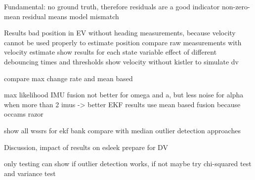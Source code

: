 Fundamental: no ground truth, therefore residuals are a good indicator
non-zero-mean residual means model mismatch~\cite[p.~158]{AlexanderWischnewski.2019}

Results
bad position in EV without heading measurements, because velocity cannot be used properly to estimate position
compare raw measurements with velocity estimate
show results for each state variable
effect of different debouncing times and thresholds
show velocity without kistler to simulate dv

compare max change rate and mean based

max likelihood IMU fusion not better for omega and a, but less noise for alpha when more than 2 imus -> better EKF results
use mean based fusion because occams razor

show all wssrs for ekf bank
compare with median outlier detection approaches


Discussion, impact of results on esleek
prepare for DV

only testing can show if outlier detection works, if not maybe try chi-squared test and variance test
